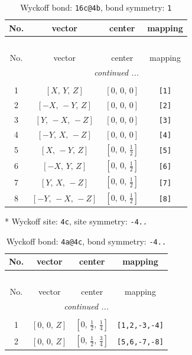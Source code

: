 \documentclass[fleqn,8pt]{jsarticle}
\begin{document}
\begin{longtable}{cccc}
\caption{Wyckoff bond: {\tt 16c@4b}, bond symmetry: {\tt 1}}
 \\
 \hline \hline
No. & vector & center & mapping \\ \hline \endfirsthead

\multicolumn{3}{l}{\tablename\ \thetable{}} \\
 \hline \hline
No. & vector & center & mapping \\ \hline \endhead

 \hline \hline
\multicolumn{3}{r}{\footnotesize\it continued ...} \\ \endfoot

 \hline \hline
\multicolumn{3}{r}{} \\ \endlastfoot

1 & $\left[ X,\, Y,\, Z \right]$ & $\left[ 0,\, 0,\, 0 \right]$ & {\tt [1]} \\ \hline
2 & $\left[ - X,\, - Y,\, Z \right]$ & $\left[ 0,\, 0,\, 0 \right]$ & {\tt [2]} \\ \hline
3 & $\left[ Y,\, - X,\, - Z \right]$ & $\left[ 0,\, 0,\, 0 \right]$ & {\tt [3]} \\ \hline
4 & $\left[ - Y,\, X,\, - Z \right]$ & $\left[ 0,\, 0,\, 0 \right]$ & {\tt [4]} \\ \hline
5 & $\left[ X,\, - Y,\, Z \right]$ & $\left[ 0,\, 0,\, \frac{1}{2} \right]$ & {\tt [5]} \\ \hline
6 & $\left[ - X,\, Y,\, Z \right]$ & $\left[ 0,\, 0,\, \frac{1}{2} \right]$ & {\tt [6]} \\ \hline
7 & $\left[ Y,\, X,\, - Z \right]$ & $\left[ 0,\, 0,\, \frac{1}{2} \right]$ & {\tt [7]} \\ \hline
8 & $\left[ - Y,\, - X,\, - Z \right]$ & $\left[ 0,\, 0,\, \frac{1}{2} \right]$ & {\tt [8]} \\
\end{longtable}
* Wyckoff site: {\tt 4c}, site symmetry: {\tt -4..}
\renewcommand{\arraystretch}{1.2}
\begin{longtable}{cccc}
\caption{Wyckoff bond: {\tt 4a@4c}, bond symmetry: {\tt -4..}}
 \\
 \hline \hline
No. & vector & center & mapping \\ \hline \endfirsthead

\multicolumn{3}{l}{\tablename\ \thetable{}} \\
 \hline \hline
No. & vector & center & mapping \\ \hline \endhead

 \hline \hline
\multicolumn{3}{r}{\footnotesize\it continued ...} \\ \endfoot

 \hline \hline
\multicolumn{3}{r}{} \\ \endlastfoot

1 & $\left[ 0,\, 0,\, Z \right]$ & $\left[ 0,\, \frac{1}{2},\, \frac{1}{4} \right]$ & {\tt [1,2,-3,-4]} \\ \hline
2 & $\left[ 0,\, 0,\, Z \right]$ & $\left[ 0,\, \frac{1}{2},\, \frac{3}{4} \right]$ & {\tt [5,6,-7,-8]} \\
\end{longtable}
\end{document}
